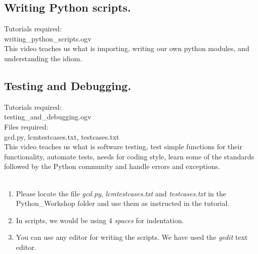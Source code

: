 \documentclass[11pt,twocolumn]{article}
\newenvironment{enumcpt}{\begin{enumerate} \topsep 0pt \partopsep 0pt 
                        \parsep 0pt
                        \itemsep 0pt \leftmargin -1in \rightmargin 0pt
                        }{\end{enumerate}}
\begin{document}
\subsection{Writing Python scripts.}
Tutorials required:\\writing\_python\_scripts.ogv \\
This video teaches us what is importing, writing our own python modules, and understanding the idiom.
\subsection{Testing and Debugging.}
Tutorials required:\\testing\_and\_debugging.ogv \\
Files required: \\gcd.py, lcmtestcases.txt, testcases.txt \\
This video teaches us what is software testing, test simple functions for their functionality, automate tests, needs for coding style, learn some of the standards followed by the Python community and handle errors and exceptions. \\ \\
\begin{enumcpt}
\item Please locate the file \emph{gcd.py}, \emph{lcmtestcases.txt} and \emph{testcases.txt}  in the Python\_Workshop folder and use them as instructed in the tutorial. 
\item In scripts, we would be using 4 \emph{spaces} for indentation.
\item You can use any editor for writing the scripts. We have used the \emph{gedit} text editor.
\end{enumcpt}
\end{document}
